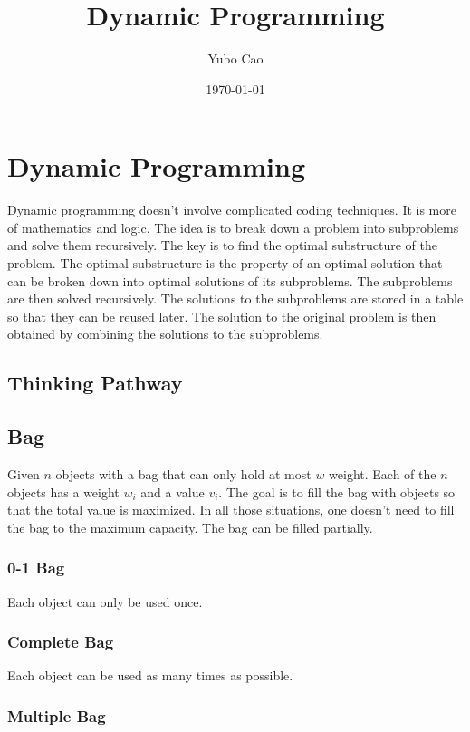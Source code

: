 \documentclass{article}
\title{Dynamic Programming}
\author{Yubo Cao}
\date{\today}
\begin{document}
\maketitle
\tableofcontents
\newpage

\section{Dynamic Programming}

Dynamic programming doesn't involve complicated coding techniques. It is more of mathematics and logic. The idea is to break down a problem into subproblems and solve them recursively. The key is to find the optimal substructure of the problem. The optimal substructure is the property of an optimal solution that can be broken down into optimal solutions of its subproblems. The subproblems are then solved recursively. The solutions to the subproblems are stored in a table so that they can be reused later. The solution to the original problem is then obtained by combining the solutions to the subproblems.

\subsection{Thinking Pathway}

\subsection{Bag}

Given $n$ objects with a bag that can only hold at most $w$ weight. Each of the $n$ objects has a weight $w_i$ and a value $v_i$. The goal is to fill the bag with objects so that the total value is maximized. In all those situations, one doesn't need to fill the bag to the maximum capacity. The bag can be filled partially.
\subsubsection{0-1 Bag}

Each object can only be used once.

\subsubsection{Complete Bag}

Each object can be used as many times as possible.

\subsubsection{Multiple Bag}
\end{document}
